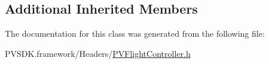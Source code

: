 \subsection*{Additional Inherited Members}


The documentation for this class was generated from the following file\+:\begin{DoxyCompactItemize}
\item 
P\+V\+S\+D\+K.\+framework/\+Headers/\hyperlink{_p_v_flight_controller_8h}{P\+V\+Flight\+Controller.\+h}\end{DoxyCompactItemize}
